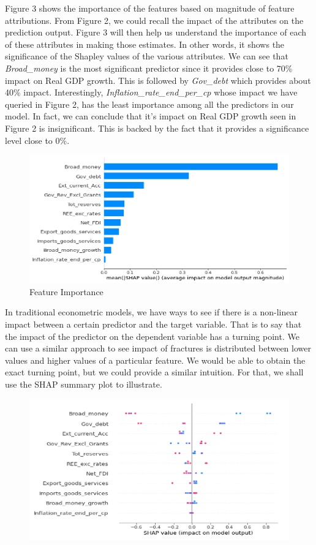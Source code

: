 \documentclass[12pt,italian, twoside]{report}
\begin{document}
\begin{enumerate}
		Figure 3 shows the importance of the features based on magnitude of feature attributions. From Figure 2, we could recall the impact of the attributes on the prediction output. Figure 3 will then help us understand the importance of each of these attributes in making those estimates. In other words, it shows the significance of the Shapley values of the various attributes. We can see that \textit{Broad\_money} is the most significant predictor since it provides close to 70\% impact on Real GDP growth. This is followed by \textit{Gov\_debt} which provides about 40\% impact. Interestingly, \textit{Inflation\_rate\_end\_per\_cp} whose impact we have queried in Figure 2, has the least importance among all the predictors in our model. In fact, we can conclude that it’s impact on Real GDP growth seen in Figure 2 is insignificant. This is backed by the fact that it provides a significance level close to 0\%.\\
		\begin{figure}[t]
		\centering
		\includegraphics[width = 150mm]{immagini/fea.png}
		\caption{Feature Importance}
		\label{fig:feat}
			\end{figure}
		In traditional econometric models, we have ways to see if there is a non-linear impact between a certain predictor and the target variable. That is to say that the impact of the predictor on the dependent variable has a turning point. We can use a similar approach to see impact of fractures is distributed between lower values and higher values of a particular feature. We would be able to obtain the exact turning point, but we could provide a similar intuition. For that, we shall use the SHAP summary plot to illustrate.
		\begin{figure}[t]
		\centering
		\includegraphics[width = 150mm]{immagini/shapsum.png}

\end{figure}
\end{enumerate}
\end{document}
